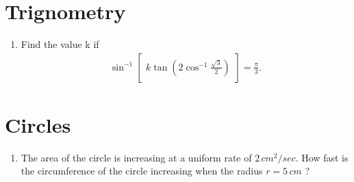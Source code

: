 \documentclass[12pt,-letter paper]{article}
\providecommand{\myvec}[1]{\ensuremath{\begin{bmatrix}#1\end{bmatrix}}}
\providecommand{\brak}[1]{\ensuremath{\left(#1\right)}}
\begin{document}
\section {Trignometry}
\begin {enumerate}
\item Find the value k if \\            
	\begin {align*} 
		\sin^{-1} \myvec{k \tan \brak{ 2\cos^{-1} \frac {\sqrt{3}}{2}}}= \frac{\pi}{3}.
		\end {align*}

\end {enumerate}

\section{Circles}
\begin {enumerate}
\item The area of the circle is increasing at a uniform rate of $2\,cm^2/sec$. How fast is the circumference of the circle increasing when the radius $r = 5\,cm$ ?
\end {enumerate}
	
\end{document}
